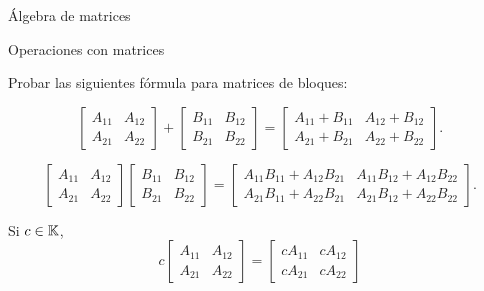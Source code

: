 \begin{chapter}{\'Algebra de matrices}
\begin{section}{Operaciones con matrices}
\begin{enumex}
            Probar las siguientes fórmula para matrices de bloques:
            \begin{enumex}
                \item \begin{equation*}
                    \begin{bmatrix} A_{11}&A_{12}\\A_{21}&A_{22}  \end{bmatrix} + 
                    \begin{bmatrix} B_{11}&B_{12}\\B_{21}&B_{22}  \end{bmatrix} =
                    \begin{bmatrix} A_{11} + B_{11} & A_{12} + B_{12} \\ 
                        A_{21} + B_{21} & A_{22} + B_{22} \end{bmatrix}. 
                \end{equation*}
                \item \begin{equation*}
                    \begin{bmatrix} A_{11}&A_{12}\\A_{21}&A_{22}  \end{bmatrix}
                    \begin{bmatrix} B_{11}&B_{12}\\B_{21}&B_{22}  \end{bmatrix} =
                    \begin{bmatrix} A_{11}B_{11}+A_{12}B_{21} & A_{11}B_{12}+A_{12}B_{22} \\ 
                        A_{21}B_{11}+A_{22}B_{21} & A_{21}B_{12}+A_{22}B_{22} \end{bmatrix}. 
                \end{equation*}
                \item Si $c \in \mathbb K$,
                \begin{equation*}
                   c \begin{bmatrix} A_{11}&A_{12}\\A_{21}&A_{22}  \end{bmatrix} =
                     \begin{bmatrix} cA_{11}&cA_{12}\\cA_{21}&cA_{22}  \end{bmatrix}
                \end{equation*}
            \end{enumex}
            

\end{enumex}
\end{section}
\end{chapter}
